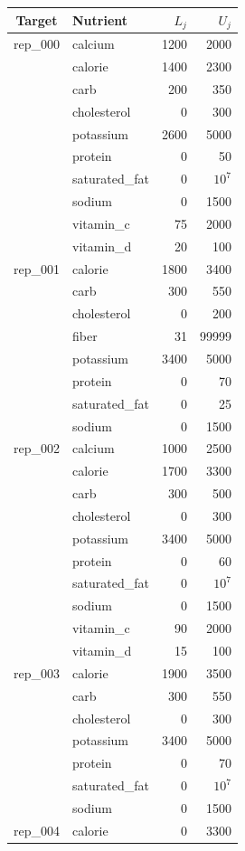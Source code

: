 \begin{tabular}{@{}clrr@{}}
\toprule
Target & Nutrient & $L_j$ & $U_j$ \\
\midrule
rep\_000 & calcium & 1200 & 2000 \\
 & calorie & 1400 & 2300 \\
 & carb & 200 & 350 \\
 & cholesterol & 0 & 300 \\
 & potassium & 2600 & 5000 \\
 & protein & 0 & 50 \\
 & saturated\_fat & 0 & $10^{7}$ \\
 & sodium & 0 & 1500 \\
 & vitamin\_c & 75 & 2000 \\
 & vitamin\_d & 20 & 100 \\
\midrule
rep\_001 & calorie & 1800 & 3400 \\
 & carb & 300 & 550 \\
 & cholesterol & 0 & 200 \\
 & fiber & 31 & 99999 \\
 & potassium & 3400 & 5000 \\
 & protein & 0 & 70 \\
 & saturated\_fat & 0 & 25 \\
 & sodium & 0 & 1500 \\
\midrule
rep\_002 & calcium & 1000 & 2500 \\
 & calorie & 1700 & 3300 \\
 & carb & 300 & 500 \\
 & cholesterol & 0 & 300 \\
 & potassium & 3400 & 5000 \\
 & protein & 0 & 60 \\
 & saturated\_fat & 0 & $10^{7}$ \\
 & sodium & 0 & 1500 \\
 & vitamin\_c & 90 & 2000 \\
 & vitamin\_d & 15 & 100 \\
\midrule
rep\_003 & calorie & 1900 & 3500 \\
 & carb & 300 & 550 \\
 & cholesterol & 0 & 300 \\
 & potassium & 3400 & 5000 \\
 & protein & 0 & 70 \\
 & saturated\_fat & 0 & $10^{7}$ \\
 & sodium & 0 & 1500 \\
\midrule
rep\_004 & calorie & 0 & 3300 \\

\end{tabular}
